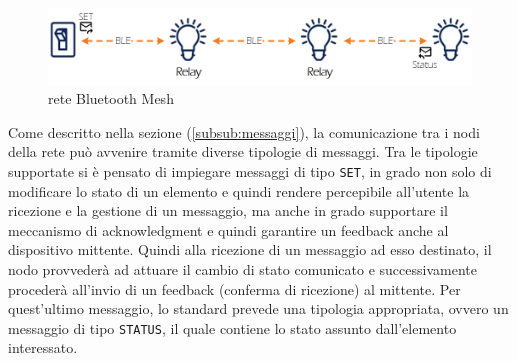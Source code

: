 \begin{figure}[!ht]
    \centering
    \includegraphics[width = \textwidth]{images/Mesh_network_2.png}
    \caption{rete Bluetooth Mesh}
    \label{fig:mesh_network}
\end{figure}

\noindent Come descritto nella sezione \textit{} (\ref{subsub:messaggi}), la comunicazione tra i nodi della rete può avvenire tramite diverse tipologie di messaggi. Tra le tipologie supportate si è pensato di impiegare messaggi di tipo \texttt{SET}, in grado non solo di modificare lo stato di un elemento e quindi rendere percepibile all'utente la ricezione e la gestione di un messaggio, ma anche in grado supportare il meccanismo di acknowledgment e quindi garantire un feedback anche al dispositivo mittente. Quindi alla ricezione di un messaggio ad esso destinato, il nodo provvederà ad attuare il cambio di stato comunicato e successivamente procederà all'invio di un feedback (conferma di ricezione) al mittente. Per quest'ultimo messaggio, lo standard prevede una tipologia appropriata, ovvero un messaggio di tipo \texttt{STATUS}, il quale contiene lo stato assunto dall'elemento interessato.\\

